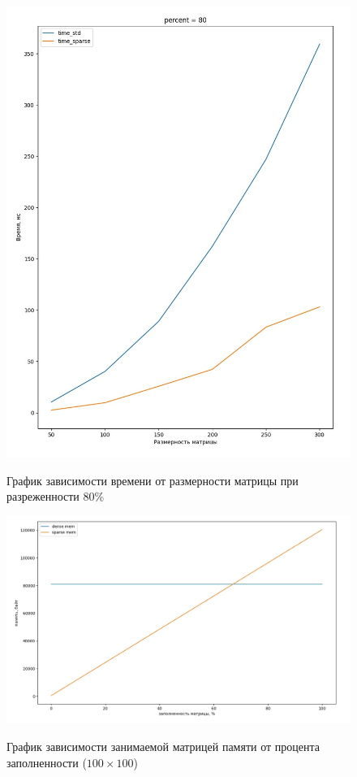 \pagebreak

\begin{figure}
	\centering
	\caption{График зависимости времени от размерности матрицы при разреженности 80\%}
	\includegraphics[width=\linewidth]{img/graph80.jpg}
	\label{graph80}
\end{figure}

\begin{figure}
	\centering
	\caption{График зависимости занимаемой матрицей памяти от процента заполненности ($100\times100$)}
	\includegraphics[width=0.8\linewidth]{img/mem.jpg}
	\label{mem}
\end{figure}

